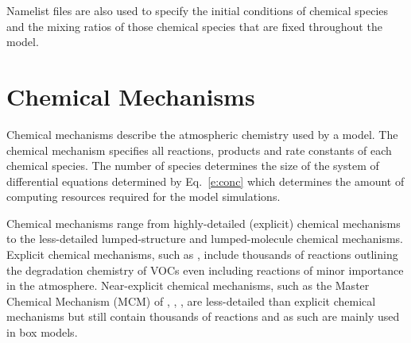 Namelist files are also used to specify the initial conditions of chemical species and the mixing ratios of those chemical species that are fixed throughout the model.

\section{Chemical Mechanisms} \label{s:chemical_mechanisms}
Chemical mechanisms describe the atmospheric chemistry used by a model.
The chemical mechanism specifies all reactions, products and rate constants of each chemical species.  
The number of species determines the size of the system of differential equations determined by Eq.~\eqref{e:conc} which determines the amount of computing resources required for the model simulations.

Chemical mechanisms range from highly-detailed (explicit) chemical mechanisms to the less-detailed lumped-structure and lumped-molecule chemical mechanisms.
Explicit chemical mechanisms, such as \citet{Aumont:2005}, include thousands of reactions outlining the degradation chemistry of VOCs even including reactions of minor importance in the atmosphere.
Near-explicit chemical mechanisms, such as the Master Chemical Mechanism (MCM) of \citet{Jenkin:1997}, \citet{Jenkin:2003}, \citet{Saunders:2003}, \citet{Bloss:2005} are less-detailed than explicit chemical mechanisms but still contain thousands of reactions and as such are mainly used in box models.

